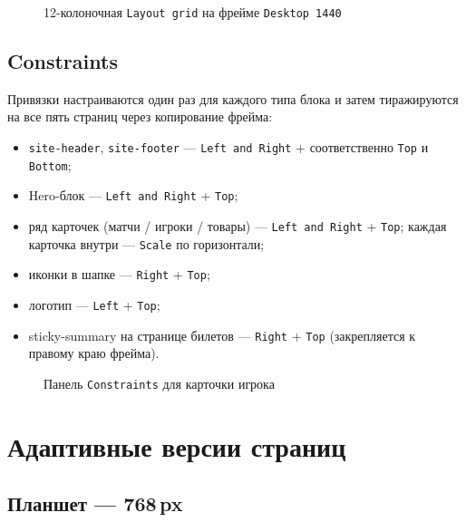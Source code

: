 \begin{figure}[h]
  \centering
  \caption{12-колоночная \texttt{Layout grid} на фрейме \texttt{Desktop~1440}}
  \label{fig:grid}
\end{figure}

\subsection{Constraints}

Привязки настраиваются один раз для каждого типа блока и затем
тиражируются на все пять страниц через копирование фрейма:
\begin{itemize}
  \item \texttt{site-header}, \texttt{site-footer} ---
        \texttt{Left~and~Right} + соответственно \texttt{Top} и
        \texttt{Bottom};
  \item Hero-блок --- \texttt{Left~and~Right} + \texttt{Top};
  \item ряд карточек (матчи / игроки / товары) ---
        \texttt{Left~and~Right} + \texttt{Top}; каждая карточка
        внутри --- \texttt{Scale} по горизонтали;
  \item иконки в шапке --- \texttt{Right} + \texttt{Top};
  \item логотип --- \texttt{Left} + \texttt{Top};
  \item sticky-summary на странице билетов ---
        \texttt{Right} + \texttt{Top} (закрепляется к правому
        краю фрейма).
\end{itemize}

\begin{figure}[h]
  \centering
  \caption{Панель \texttt{Constraints} для карточки игрока}
  \label{fig:constraints}
\end{figure}

\section{Адаптивные версии страниц}

\subsection{Планшет --- 768\,px}

